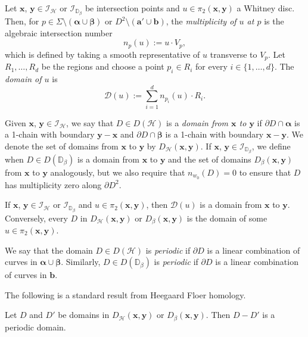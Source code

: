 \documentclass[11pt]{amsart}
\numberwithin{equation}{section}
\numberwithin{figure}{section}
\theoremstyle{definition}
\newcommand{\cD}{\mathcal{D}}
\newcommand{\cH}{\mathcal{H}}
\newcommand{\cI}{\mathcal{I}}
\newcommand{\bD}{\mathbb{D}}
\newcommand{\as}{\boldsymbol{\alpha}}
\newcommand{\bs}{\boldsymbol{\beta}}
\newcommand{\ba}{\boldsymbol{a}}
\newcommand{\bb}{\boldsymbol{b}}
\newcommand{\xs}{\boldsymbol{x}}
\newcommand{\ys}{\boldsymbol{y}}
\begin{document}
\begin{defn}\label{def:multiplicity}
Let $\xs$, $\ys \in \cI_{\cH}$ or $\cI_{\bD_\beta}$ be intersection points and $u \in \pi_2(\xs, \ys)$ a Whitney disc. Then, for $p \in \Sigma \setminus (\as \cup \bs)$ or $D^2 \setminus (\ba' \cup \bb)$, the \emph{multiplicity of $u$ at $p$} is the algebraic intersection number
\[
n_p(u):= u \cdot V_p,
\]
which is defined by taking a smooth representative of $u$ transverse to $V_p$. Let $R_1,\dots,R_d$ be the regions and choose a point $p_i \in R_i$ for every $i \in \{1,\dots,d\}$. The \emph{domain of $u$} is 
\[
\mathcal D(u) := \sum_{i=1}^d n_{p_i}(u) \cdot R_i.
\]
\end{defn}

\begin{defn}\label{def:xy-domains}
    Given $\xs$, $\ys \in \cI_{\cH}$, we say that $D \in D(\cH)$ is a \emph{domain from $\xs$ to $\ys$} if $\partial D \cap \as$ is a 1-chain with boundary $\ys - \xs$ and $\partial D \cap \bs$ is a 1-chain with boundary $\xs - \ys$. We denote the set of domains from $\xs$ to $\ys$ by $D_{\cH}(\xs,\ys)$. If $\xs$, $\ys \in \cI_{\bD_\beta}$, we define when $D \in D(\bD_\beta)$ is a domain from $\xs$ to $\ys$ and the set of domains $D_{\beta}(\xs,\ys)$ from $\xs$ to $\ys$ analogously, but we also require that $n_{w_0}(D) = 0$ to ensure that $D$ has multiplicity zero along $\partial D^2$.
\end{defn}

\begin{rmk}
If $\xs$, $\ys \in \cI_{\cH}$ or $\cI_{\bD_\beta}$ and $u \in \pi_2(\xs,\ys)$, then $\cD(u)$ is a domain from $\xs$ to $\ys$. Conversely, every $D$ in $D_{\cH}(\xs,\ys)$ or $D_\beta(\xs,\ys)$ is the domain of some $u \in \pi_2(\xs,\ys)$.
\end{rmk}

\begin{defn}
    We say that the domain $D \in D(\cH)$ is \emph{periodic} if $\partial D$ is a linear combination of curves in $\as \cup \bs$. Similarly, $D \in D(\bD_\beta)$ is \emph{periodic} if $\partial D$ is a linear combination of curves in $\bb$.
\end{defn}

The following is a standard result from Heegaard Floer homology.

\begin{lem}
    Let $D$ and $D'$ be domains in $D_{\cH}(\xs,\ys)$ or $D_{\beta}(\xs,\ys)$. Then $D-D'$ is a periodic domain.
\end{lem}
\end{document}
